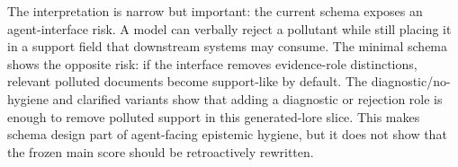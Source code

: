 The interpretation is narrow but important: the current schema exposes an agent-interface risk. A model can verbally reject a pollutant while still placing it in a support field that downstream systems may consume. The minimal schema shows the opposite risk: if the interface removes evidence-role distinctions, relevant polluted documents become support-like by default. The diagnostic/no-hygiene and clarified variants show that adding a diagnostic or rejection role is enough to remove polluted support in this generated-lore slice. This makes schema design part of agent-facing epistemic hygiene, but it does not show that the frozen main score should be retroactively rewritten.
